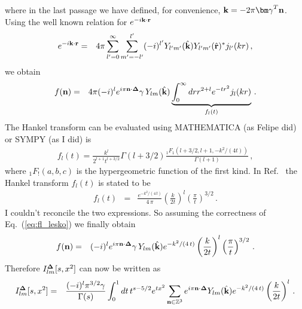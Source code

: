 	where in the last passage we have defined, for convenience, ${\bf k}=-2\pi{\bm \gamma}^T{\bf n}$. Using the well known relation for $e^{-i{\bf k}\cdot{\bf r}}$
	\begin{eqnarray}
	e^{-i{\bf k}\cdot{\bf r}}&=&4\pi\sum_{l^\prime=0}^{\infty}\sum_{m^\prime=-l^\prime}^{l^\prime}(-i)^{l^\prime}Y_{l^\prime m^\prime}({\hat {\bf k}})Y_{l^\prime m^\prime}(\hat{{\bf r}})^*j_{l^\prime}(kr)\, ,
	\end{eqnarray}
	we obtain
	\begin{eqnarray}
	f({\bf n})&=&4\pi (-i)^le^{i\pi{\bf n}\cdot{\bf\Delta}}\gamma\, Y_{lm}(\hat{{\bf k}})\underbrace{\int_0^\infty dr r^{2+l} e^{-tr^2}j_l(kr)}_{f_l(t)}\, .\label{eq:fn_final}
	\end{eqnarray}
	{\color{red}
	The Hankel transform can be evaluated using MATHEMATICA (as Felipe did) or SYMPY (as I did) is
	\begin{eqnarray}
	f_l(t)=\frac{k^l}{2^{l+1}t^{l+3/2}}\Gamma(l+3/2)\frac{_1F_1(l+3/2,l+1,-k^2/(4t))}{\Gamma(l+1)}\, ,
	\end{eqnarray}
	where $_1F_!(a,b,c)$ is the hypergeometric function of the first kind.}
	In Ref.~\cite{Leskovec:2012gb} the Hankel transform $f_l(t)$ is stated to be
	\begin{eqnarray}
	f_l(t)&=&\frac{e^{-k^2/(4\,t)}}{4\,\pi}\left(\frac{k}{2t}\right)^l\left(\frac{\pi}{t}\right)^{3/2}\, .\label{eq:fl_lesko}
	\end{eqnarray}
	{\color{red}I couldn't reconcile the two expressions}. So assuming the correctness of Eq.~(\ref{eq:fl_lesko}) we finally obtain
	\begin{eqnarray}
	f({\bf n})&=&(-i)^le^{i\pi{\bf n}\cdot{\bf\Delta}}\gamma\, Y_{lm}(\hat{{\bf k}})e^{-k^2/(4\,t)}\left(\frac{k}{2t}\right)^l\left(\frac{\pi}{t}\right)^{3/2}\, .
	\end{eqnarray}
	Therefore $I^{\bf\Delta}_{lm}[s,x^2]$ can now be written as
	\begin{eqnarray}
		I^{\bf\Delta}_{lm}[s,x^2]&=&\frac{(-i)^l\pi^{3/2}\gamma}{\Gamma(s)}\int_0^1dt\,t^{s-5/2}e^{tx^2}\sum_{{\bf n}\in\mathbb{Z}^3}e^{i\pi{\bf n}\cdot{\bf \Delta}}Y_{lm}(\hat{\bf k})e^{-k^2/(4\,t)}\left(\frac{k}{2t}\right)^l\, .
	\end{eqnarray}
